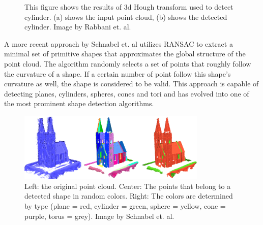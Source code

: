 \begin{figure}
\centering
{}
\caption{This figure shows the results of 3d Hough transform used to detect cylinder. (a) shows the input point cloud, (b) shows the detected cylinder. Image by Rabbani et. al\cite{rabbani2005efficient}.}
\label{fig:hough_cylinder}
\end{figure}


A more recent approach by Schnabel et. al\cite{schnabel-2007-efficient} utilizes RANSAC\cite{fischler1981random} to extract a minimal set of primitive shapes that approximates the global structure of the point cloud. The algorithm randomly selects a set of points that roughly follow the curvature of a shape. If a certain number of point follow this shape's curvature as well, the shape is considered to be valid. This approach is capable of detecting planes, cylinders, spheres, cones and tori and has evolved into one of the most prominent shape detection algorithms. 

\begin{figure}
    \centering
    \includegraphics[width=0.8\textwidth]{Related_Work/schnabel_example.png}%
    \caption{Left: the original point cloud. Center: The points that belong to a detected shape in random colors. Right: The colors are determined by type (plane = red, cylinder = green, sphere = yellow, cone = purple, torus = grey). Image by Schnabel et. al\cite{schnabel-2007-efficient}. }
    \label{fig:schnabel_church}
\end{figure}

